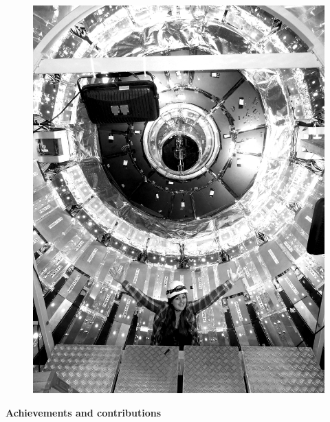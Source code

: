 \cleardoublepage\thispagestyle{empty}

\begin{center}
	
	\vspace*{10mm}
     
	


\begin{figure}[th]
	\centering
	\includegraphics[width=0.5\linewidth]{./isis}
\end{figure}
\vspace{10mm}
\huge \textbf{Achievements and contributions}
	\vspace{10mm}

\end{center}

\cleardoublepage
\setlength{\topmargin}{0mm}
\normalsize%
